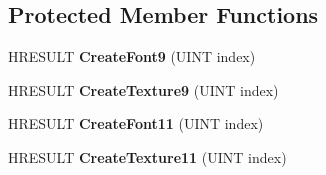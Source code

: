 \subsection*{Protected Member Functions}
\begin{DoxyCompactItemize}
\item 
\hypertarget{class_c_d_x_u_t_dialog_resource_manager_a711c30b34f1149705463caf2fd74a8ed}{H\+R\+E\+S\+U\+L\+T {\bfseries Create\+Font9} (U\+I\+N\+T index)}\label{class_c_d_x_u_t_dialog_resource_manager_a711c30b34f1149705463caf2fd74a8ed}

\item 
\hypertarget{class_c_d_x_u_t_dialog_resource_manager_a339ef01ea8bf4d239d10d163cb815d8a}{H\+R\+E\+S\+U\+L\+T {\bfseries Create\+Texture9} (U\+I\+N\+T index)}\label{class_c_d_x_u_t_dialog_resource_manager_a339ef01ea8bf4d239d10d163cb815d8a}

\item 
\hypertarget{class_c_d_x_u_t_dialog_resource_manager_aa985d5cd640820282303c9dd807a1c72}{H\+R\+E\+S\+U\+L\+T {\bfseries Create\+Font11} (U\+I\+N\+T index)}\label{class_c_d_x_u_t_dialog_resource_manager_aa985d5cd640820282303c9dd807a1c72}

\item 
\hypertarget{class_c_d_x_u_t_dialog_resource_manager_ad50d3e0c3687b008ffff55a828df3fdb}{H\+R\+E\+S\+U\+L\+T {\bfseries Create\+Texture11} (U\+I\+N\+T index)}\label{class_c_d_x_u_t_dialog_resource_manager_ad50d3e0c3687b008ffff55a828df3fdb}

\end{DoxyCompactItemize}
